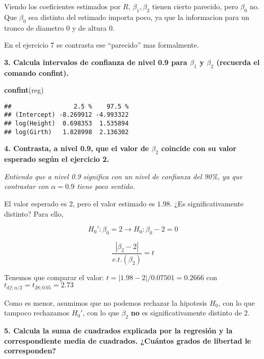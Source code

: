 \documentclass[]{article}
\newenvironment{Shaded}{\begin{snugshade}}{\end{snugshade}}
\newcommand{\KeywordTok}[1]{\textcolor[rgb]{0.13,0.29,0.53}{\textbf{{#1}}}}
\newcommand{\NormalTok}[1]{{#1}}
\begin{document}
Viendo los coeficientes estimados por \(R\), \(\beta_1,\beta_2\) tienen
cierto parecido, pero \(\beta_0\) no. Que \(\beta_0\) sea distinto del
estimado importa poco, ya que la informacion para un tronco de diametro
0 y de altura 0.

En el ejercicio 7 se contrasta ese ``parecido'' mas formalmente.

\textbf{3. Calcula intervalos de confianza de nivel 0.9 para \(\beta_1\)
y \(\beta_2\) (recuerda el comando confint).}

\begin{Shaded}
\begin{Highlighting}[]
\KeywordTok{confint}\NormalTok{(reg)}
\end{Highlighting}
\end{Shaded}

\begin{verbatim}
##                 2.5 %    97.5 %
## (Intercept) -8.269912 -4.993322
## log(Height)  0.698353  1.535894
## log(Girth)   1.828998  2.136302
\end{verbatim}

\textbf{4. Contrasta, a nivel 0.9, que el valor de \(\beta_2\) coincide
con su valor esperado según el ejercicio 2.}

\emph{Entiendo que a nivel 0.9 significa con un nivel de confianza del
90\%, ya que contrastar con \(\alpha=0.9\) tiene poco sentido.}

El valor esperado es \(2\), pero el valor estimado es \(1.98\). ¿Es
significativamente distinto? Para ello,

\[
H_0' : \beta_0 = 2 \rightarrow H_0 : \beta_0 - 2 = 0
\]

\[
\frac{|\beta_2 - 2|}{e.t.(\beta_2)} = t
\]

Tenemos que comparar el valor: \(t = |1.98-2|/0.07501 = 0.2666\) con
\(t_{df;\alpha/2} = t_{28;0.05} = 2.73\)

Como es menor, asumimos que no podemos rechazar la hipotesis \(H_0\),
con lo que tampoco rechazamos \(H_0'\), con lo que \(\beta_2\)
\textbf{no} es significativamente distinto de 2.

\textbf{5. Calcula la suma de cuadrados explicada por la regresión y la
correspondiente media de cuadrados. ¿Cuántos grados de libertad le
corresponden?}
\end{document}

